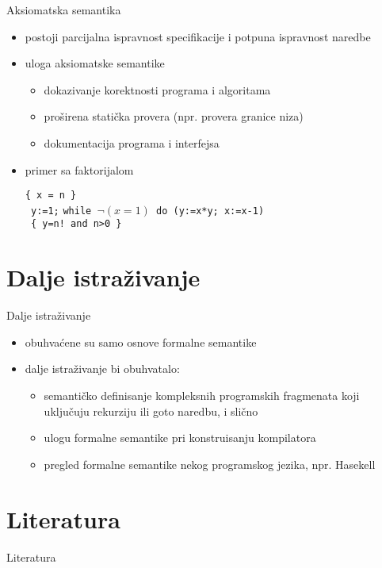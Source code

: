 \documentclass{beamer}
\begin{document}
\begin{frame}{Aksiomatska semantika}
 \begin{itemize}
  \item postoji parcijalna ispravnost specifikacije i potpuna ispravnost naredbe
  \item uloga aksiomatske semantike
  \begin{itemize}
  \item dokazivanje korektnosti programa i algoritama
   \item proširena statička provera (npr. provera granice niza)
   \item dokumentacija programa i interfejsa
    \end{itemize} 
    \item primer sa faktorijalom
  \begin{tcolorbox}
  \begin{center}


\texttt{\{ x = n \}}   \\
\texttt{ y:=1;} 
 \texttt{while $ \neg(x=1) $   do  (y:=x*y; x:=x-1) }\\
\texttt{ \{ y=n! and  n>0 \}  } \\
\end{center}
\end{tcolorbox}
  \end{itemize} 
\end{frame}
\section{Dalje istraživanje}
\begin{frame}{Dalje istraživanje}
  \begin{itemize}
  \item obuhvaćene su samo osnove formalne semantike
  \item dalje istraživanje bi obuhvatalo:
  \begin{itemize}
  	 \item semantičko definisanje kompleksnih programskih fragmenata koji uključuju rekurziju ili goto naredbu, i slično
  	 \item ulogu formalne semantike pri konstruisanju kompilatora
  	 \item pregled formalne semantike nekog programskog jezika, npr. Hasekell
  \end{itemize}
  

  \end{itemize}
\end{frame}
\section{Literatura}
\begin{frame}{Literatura}
  
\end{frame}
\end{document}
